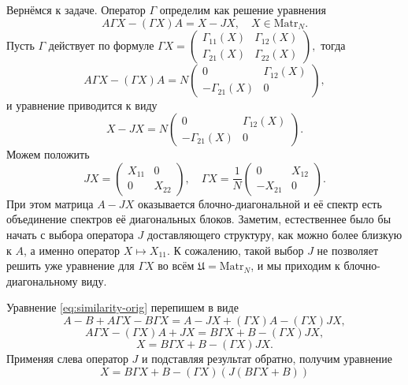 Вернёмся к задаче.
Оператор \( \Gamma \) определим как решение уравнения\footnotemark
\[
    A\Gamma X - (\Gamma X) A = X - JX,\quad X\in\mathrm{Matr}_{N}.
    \]%
%
Пусть \( \Gamma \) действует по формуле
\( \Gamma X =
\begin{pmatrix}
    \Gamma_{11}(X) & \Gamma_{12}(X) \\
    \Gamma_{21}(X) & \Gamma_{22}(X)
\end{pmatrix}, \)
тогда
\[
    A \Gamma X - (\Gamma X) A =
    N
    \begin{pmatrix}
        0               & \Gamma_{12}(X) \\
        -\Gamma_{21}(X) & 0
    \end{pmatrix},
\]
и уравнение приводится к виду
\[
    X - JX =
    N
    \begin{pmatrix}
        0               & \Gamma_{12}(X) \\
        -\Gamma_{21}(X) & 0
    \end{pmatrix}.
\]
Можем положить
\[
    JX = \begin{pmatrix}
        X_{11} & 0 \\
        0      & X_{22}
    \end{pmatrix},\quad
    \Gamma X =
    \frac1N
    \begin{pmatrix}
        0       & X_{12} \\
        -X_{21} & 0
    \end{pmatrix}.
    \]
При этом матрица \( A - JX \) оказывается блочно-диагональной
и её спектр есть объединение спектров её диагональных блоков.
Заметим, естественнее было бы начать с выбора оператора \( J \) доставляющего структуру,
как можно более близкую к \( A \), а именно
оператор \( X\mapsto X_{11} \).
К сожалению, такой выбор \( J \) не позволяет решить
уже уравнение для \(\Gamma X\) во всём \(\mathfrak U = \mathrm{Matr}_{N}\),
и мы приходим к блочно-диагональному виду.

Уравнение \eqref{eq:similarity-orig} перепишем в виде
\[
    A - B + A\Gamma X - B\Gamma X = A - JX + (\Gamma X) A - (\Gamma X) JX,
    \]
\[
    A\Gamma X - (\Gamma X) A + JX = B \Gamma X + B - (\Gamma X) JX,
    \]
\[
    X = B \Gamma X + B - (\Gamma X) JX.
    \]
Применяя слева оператор \( J \) и подставляя результат обратно, получим уравнение
\begin{equation}\label{eq:similarity2}
    X = B \Gamma X + B - (\Gamma X) (J(B\Gamma X + B))
\end{equation}

